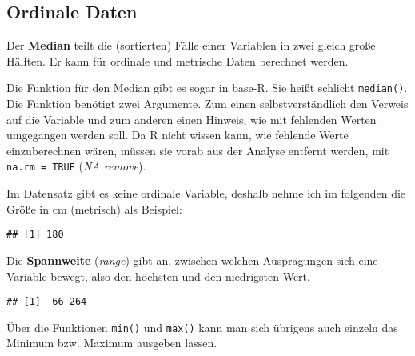\documentclass[
]{book}
\newenvironment{Shaded}{\begin{snugshade}}{\end{snugshade}}
\newcommand{\AttributeTok}[1]{\textcolor[rgb]{0.77,0.63,0.00}{#1}}
\newcommand{\ConstantTok}[1]{\textcolor[rgb]{0.00,0.00,0.00}{#1}}
\newcommand{\FunctionTok}[1]{\textcolor[rgb]{0.00,0.00,0.00}{#1}}
\newcommand{\NormalTok}[1]{#1}
\newcommand{\SpecialCharTok}[1]{\textcolor[rgb]{0.00,0.00,0.00}{#1}}
\begin{document}
\hypertarget{ordinale-daten}{%
\subsection{Ordinale Daten}\label{ordinale-daten}}

Der \textbf{Median} teilt die (sortierten) Fälle einer Variablen in zwei gleich große Hälften. Er kann für ordinale und metrische Daten berechnet werden.

Die Funktion für den Median gibt es sogar in base-R. Sie heißt schlicht \texttt{median()}. Die Funktion benötigt zwei Argumente. Zum einen selbstverständlich den Verweis auf die Variable und zum anderen einen Hinweis, wie mit fehlenden Werten umgegangen werden soll. Da R nicht wissen kann, wie fehlende Werte einzuberechnen wären, müssen sie vorab aus der Analyse entfernt werden, mit \texttt{na.rm\ =\ TRUE} (\emph{NA remove}).

Im Datensatz gibt es keine ordinale Variable, deshalb nehme ich im folgenden die Größe in cm (metrisch) als Beispiel:

\begin{Shaded}
\end{Shaded}

\begin{verbatim}
## [1] 180
\end{verbatim}

Die \textbf{Spannweite} (\emph{range}) gibt an, zwischen welchen Ausprägungen sich eine Variable bewegt, also den höchsten und den niedrigsten Wert.

\begin{Shaded}
\end{Shaded}

\begin{verbatim}
## [1]  66 264
\end{verbatim}

Über die Funktionen \texttt{min()} und \texttt{max()} kann man sich übrigens auch einzeln das Minimum bzw. Maximum ausgeben lassen.
\end{document}
